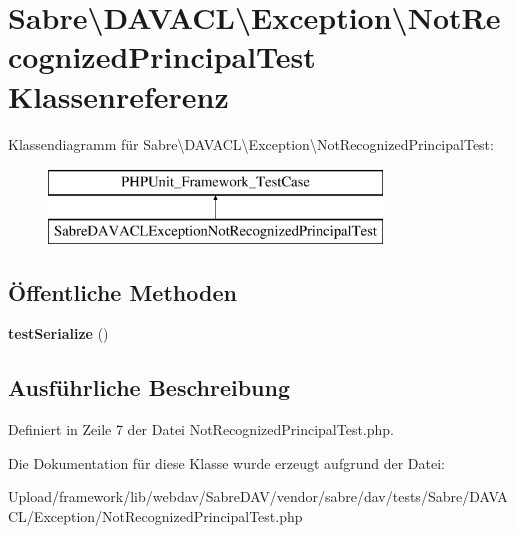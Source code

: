 \hypertarget{class_sabre_1_1_d_a_v_a_c_l_1_1_exception_1_1_not_recognized_principal_test}{}\section{Sabre\textbackslash{}D\+A\+V\+A\+CL\textbackslash{}Exception\textbackslash{}Not\+Recognized\+Principal\+Test Klassenreferenz}
\label{class_sabre_1_1_d_a_v_a_c_l_1_1_exception_1_1_not_recognized_principal_test}
Klassendiagramm für Sabre\textbackslash{}D\+A\+V\+A\+CL\textbackslash{}Exception\textbackslash{}Not\+Recognized\+Principal\+Test\+:\begin{figure}[H]
\begin{center}
\leavevmode
\includegraphics[height=2.000000cm]{class_sabre_1_1_d_a_v_a_c_l_1_1_exception_1_1_not_recognized_principal_test}
\end{center}
\end{figure}
\subsection*{Öffentliche Methoden}
\begin{DoxyCompactItemize}
\item 
\mbox{\label{class_sabre_1_1_d_a_v_a_c_l_1_1_exception_1_1_not_recognized_principal_test_a89518a53cdcb9bd1d38de4a9e37a94e3}} 
{\bfseries test\+Serialize} ()
\end{DoxyCompactItemize}


\subsection{Ausführliche Beschreibung}


Definiert in Zeile 7 der Datei Not\+Recognized\+Principal\+Test.\+php.



Die Dokumentation für diese Klasse wurde erzeugt aufgrund der Datei\+:\begin{DoxyCompactItemize}
\item 
Upload/framework/lib/webdav/\+Sabre\+D\+A\+V/vendor/sabre/dav/tests/\+Sabre/\+D\+A\+V\+A\+C\+L/\+Exception/Not\+Recognized\+Principal\+Test.\+php\end{DoxyCompactItemize}
